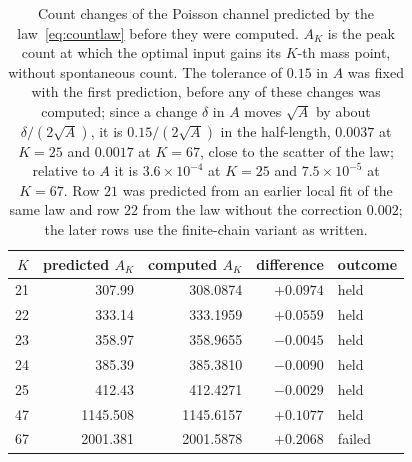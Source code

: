 \begin{table}[tp]
\caption{Count changes of the Poisson channel predicted by the law~\eqref{eq:countlaw} before they were computed. $A_K$ is
the peak count at which the optimal input gains its $K$-th mass point, without spontaneous count. The tolerance of $0.15$ in $A$ was fixed with the first prediction, before
any of these changes was computed; since a change $\delta$ in $A$ moves $\sqrt A$ by about $\delta/(2\sqrt A)$, it is $0.15/(2\sqrt A)$
in the half-length, $0.0037$ at $K=25$ and $0.0017$ at $K=67$, close to the scatter of the law; relative to $A$ it is $3.6\times10^{-4}$
at $K=25$ and $7.5\times10^{-5}$ at $K=67$. Row $21$ was predicted from an earlier local fit of the same law and row $22$ from the law without the correction
$0.002$; the later rows use the finite-chain variant as written.}\label{tab:countlaw}
\centering\small
\begin{tabular}{rrrrl}
\hline
$K$ & predicted $A_K$ & computed $A_K$ & difference & outcome\\
\hline
21 & 307.99 & 308.0874 & $+0.0974$ & held\\
22 & 333.14 & 333.1959 & $+0.0559$ & held\\
23 & 358.97 & 358.9655 & $-0.0045$ & held\\
24 & 385.39 & 385.3810 & $-0.0090$ & held\\
25 & 412.43 & 412.4271 & $-0.0029$ & held\\
47 & 1145.508 & 1145.6157 & $+0.1077$ & held\\
67 & 2001.381 & 2001.5878 & $+0.2068$ & failed\\
\hline
\end{tabular}
\end{table}

